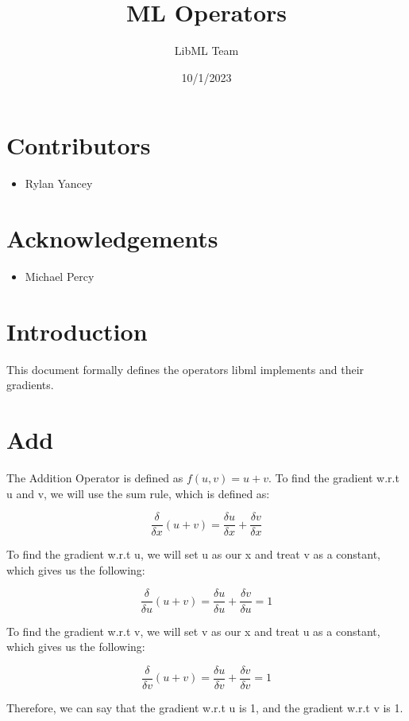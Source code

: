 \documentclass{article}
\title{ML Operators}
\author{LibML Team}
\date{10/1/2023}
\begin{document}
    \maketitle
    \section*{Contributors}
        \begin{itemize}
            \item Rylan Yancey
        \end{itemize}
    \section*{Acknowledgements}
        \begin{itemize}
            \item Michael Percy
        \end{itemize}
    \section*{Introduction}
        This document formally defines the operators libml implements and their gradients. 

\noindent\makebox[\linewidth]{\rule{\paperwidth}{0.4pt}}
    \section{Add}
        The Addition Operator is defined as $f(u,v) = u + v$. To find the gradient w.r.t u and v, 
        we will use the sum rule, which is defined as: 

        $$\frac{\delta}{\delta{x}}(u + v) = \frac{\delta{u}}{\delta{x}} + \frac{\delta{v}}{\delta{x}}$$

        To find the gradient w.r.t u, we will set u as our x and treat v as a constant, 
        which gives us the following:

        $$\frac{\delta}{\delta{u}}(u + v) = \frac{\delta{u}}{\delta{u}} + \frac{\delta{v}}{\delta{u}} = 1$$

        To find the gradient w.r.t v, we will set v as our x and treat u as a constant, 
        which gives us the following:

        $$\frac{\delta}{\delta{v}}(u + v) = \frac{\delta{u}}{\delta{v}} + \frac{\delta{v}}{\delta{v}} = 1$$

        Therefore, we can say that the gradient w.r.t u is 1, and the gradient w.r.t v is 1.
\end{document}
